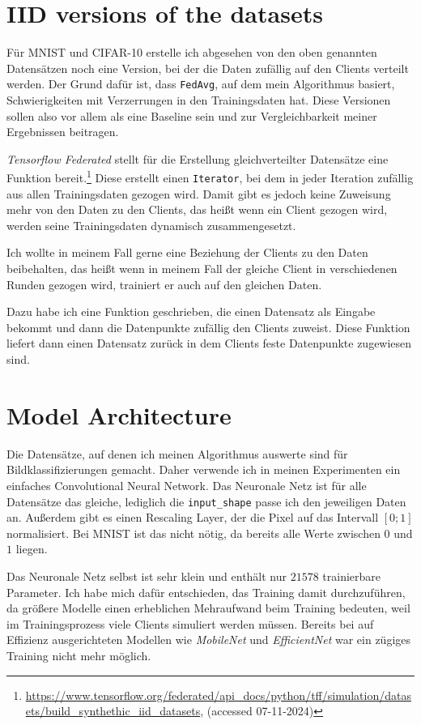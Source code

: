 \section{IID versions of the datasets}\label{sec:iid-dataset-creation}
Für MNIST und CIFAR-10 erstelle ich abgesehen von den oben genannten Datensätzen noch eine Version, bei der die Daten zufällig auf den Clients verteilt werden. Der Grund dafür ist, dass \texttt{FedAvg}, auf dem mein Algorithmus basiert, Schwierigkeiten mit Verzerrungen in den Trainingsdaten hat. Diese Versionen sollen also vor allem als eine Baseline sein und zur Vergleichbarkeit meiner Ergebnissen beitragen.

\textit{Tensorflow Federated} stellt für die Erstellung gleichverteilter Datensätze eine Funktion bereit.\footnote{\url{https://www.tensorflow.org/federated/api_docs/python/tff/simulation/datasets/build_synthethic_iid_datasets}, (accessed 07-11-2024)} Diese erstellt einen \texttt{Iterator}, bei dem in jeder Iteration zufällig aus allen Trainingsdaten gezogen wird. Damit gibt es jedoch keine Zuweisung mehr von den Daten zu den Clients, das heißt wenn ein Client gezogen wird, werden seine Trainingsdaten dynamisch zusammengesetzt.

Ich wollte in meinem Fall gerne eine Beziehung der Clients zu den Daten beibehalten, das heißt wenn in meinem Fall der gleiche Client in verschiedenen Runden gezogen wird, trainiert er auch auf den gleichen Daten.

Dazu habe ich eine Funktion geschrieben, die einen Datensatz als Eingabe bekommt und dann die Datenpunkte zufällig den Clients zuweist. Diese Funktion liefert dann einen Datensatz zurück in dem Clients feste Datenpunkte zugewiesen sind.

\section{Model Architecture}
Die Datensätze, auf denen ich meinen Algorithmus auswerte sind für Bildklassifizierungen gemacht. Daher verwende ich in meinen Experimenten ein einfaches Convolutional Neural Network. Das Neuronale Netz ist für alle Datensätze das gleiche, lediglich die \texttt{input\_shape} passe ich den jeweiligen Daten an. Außerdem gibt es einen Rescaling Layer, der die Pixel auf das Intervall $[0;1]$ normalisiert. Bei MNIST ist das nicht nötig, da bereits alle Werte zwischen $0$ und $1$ liegen.

Das Neuronale Netz selbst ist sehr klein und enthält nur $21578$ trainierbare Parameter. Ich habe mich dafür entschieden, das Training damit durchzuführen, da größere Modelle einen erheblichen Mehraufwand beim Training bedeuten, weil im Trainingsprozess viele Clients simuliert werden müssen. Bereits bei auf Effizienz ausgerichteten Modellen wie \textit{MobileNet} \cite{howard:2017} und \textit{EfficientNet} \cite{tan:2019} war ein zügiges Training nicht mehr möglich.

